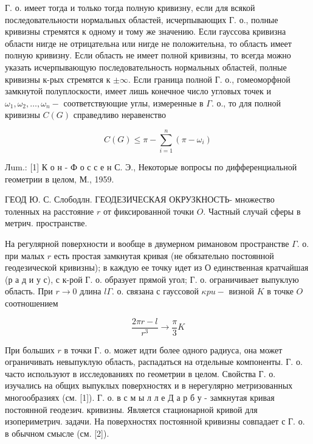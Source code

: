 \documentclass[10pt]{article}
\begin{document}
Г. о. имеет тогда и только тогда полную кривизну, если для всякой последовательности нормальных областей, исчерпывающих Г. о., полные кривизны стремятся к одному и тому же значению. Если гауссова кривизна области нигде не отрицательна или нигде не положительна, то область имеет полную кривизну. Если область не имеет полной кривизны, то всегда можно указать исчерпывающую последовательность нормальных областей, полные кривизны к-рых стремятся к $\pm \infty$. Если граница полной Г. о., гомеоморфной замкнутой полуплоскости, имеет лишь конечное число угловых точек и $\omega_{1}, \omega_{2}, \ldots, \omega_{n}-$ соответствующие углы, измеренные в $\Gamma$. о., то для полной кривизны $C(G)$ справедливо неравенство



\[

C(G) \leqslant \pi-\sum_{i=1}^{n}\left(\pi-\omega_{i}\right)

\]



Лum.: [1] К о н - Ф о с с е н С. Э., Некоторые вопросы по дифференциальной геометрии в целом, М., 1959.



ГЕОД Ю. С. Слободлн. ГЕОДЕЗИЧЕСКАЯ ОКРУЗКНОСТЬ- множество толенных на расстояние $r$ от фиксированной точки $O$. Частный случай сферы в метрич. пространстве.



На регулярной поверхности и вообще в двумерном римановом пространстве $\Gamma$. о. при малых $r$ есть простая замкнутая кривая (не обязательно постоянной геодезической кривизны); в каждую ее точку идет из $О$ единственная кратчайшая (р а д и у с), с к-рой Г. $о$. образует прямой угол; Г. о. ограничивает выпуклую область. При $r \rightarrow 0$ длина $l \Gamma$. о. связана с гауссовой $\kappa p u-$ визной $K$ в точке $O$ соотношением



\[

\frac{2 \pi r-l}{r^{3}} \longrightarrow \frac{\pi}{3} K

\]



При больших $r$ в точки Г. о. может идти более одного радиуса, она может ограничивать невыпуклую область, распадаться на отдельные компоненты. Г. о. часто используют в исследованиях по геометрии в целом. Свойства Г. о. изучались на общих выпуклых поверхностях и в нерегулярно метризованных многообразиях (см. [1]). Г. о. в с м ы л л е Д а р б у - замкнутая кривая постоянной геодезич. кривизны. Является стационарной кривой для изопериметрич. задачи. На поверхностях постоянной кривизны совпадает с Г. о. в обычном смысле (см. [2]).
\end{document}
